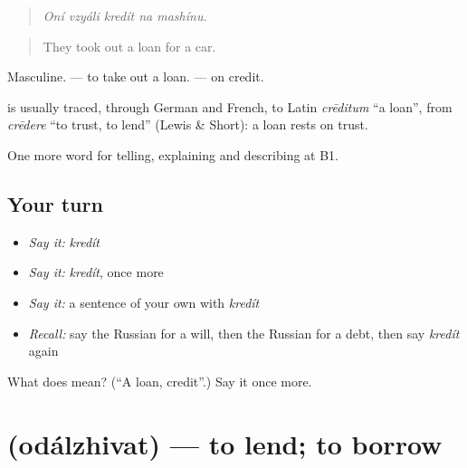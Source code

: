 \begin{quote}
\emph{Oní vzyáli kredít na mashínu.}
\end{quote}

\begin{quote}
They took out a loan for a car.
\end{quote}

Masculine. \emph{ } — to take out a loan. \emph{ } — on credit.

\begin{cousinweb}
\textbf{} is usually traced, through German and French, to Latin \emph{crēditum} \textquotedblleft{}a loan\textquotedblright{}, from \emph{crēdere} \textquotedblleft{}to trust, to lend\textquotedblright{} (Lewis \& Short): a loan rests on trust.
\end{cousinweb}

\begin{grammarlens}[title={What you've built}]
One more word for telling, explaining and describing at B1.
\end{grammarlens}

\subsection*{Your turn}
\begin{itemize}
\raggedright
  \item \emph{Say it:} \emph{kredít}
  \item \emph{Say it:} \emph{kredít}, once more
  \item \emph{Say it:} a sentence of your own with \emph{kredít}
  \item \emph{Recall:} say the Russian for a will, then the Russian for a debt, then say \emph{kredít} again
\end{itemize}

\begin{tcolorbox}[breakable,colback=teal!4,colframe=teal!35!black,title={Before you move on}]
What does  mean? (\textquotedblleft{}A loan, credit\textquotedblright{}.) Say it once more.
\end{tcolorbox}
\section[\texorpdfstring{\ru{одалживать} (odálzhivat)}{одалживать (odálzhivat)}]{ (odálzhivat) — to lend; to borrow}

\label{lesson:RU-C394-odalzhivat}



